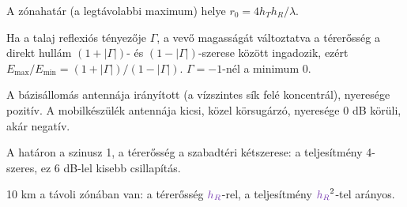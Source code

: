 A zónahatár (a legtávolabbi maximum) helye $r_0=4h_Th_R/\lambda$.

\begin{center}\end{center}

Ha a talaj reflexiós tényezője $\Gamma$, a vevő magasságát változtatva a térerősség a direkt hullám $(1+|\Gamma|)$- és $(1-|\Gamma|)$-szerese között ingadozik, ezért $E_{\max}/E_{\min}=(1+|\Gamma|)/(1-|\Gamma|)$. $\Gamma=-1$-nél a minimum 0.

\begin{center}\end{center}

A bázisállomás antennája irányított (a vízszintes sík felé koncentrál), nyeresége pozitív. A mobilkészülék antennája kicsi, közel körsugárzó, nyeresége 0 dB körüli, akár negatív.

A határon a szinusz 1, a térerősség a szabadtéri kétszerese: a teljesítmény 4-szeres, ez 6 dB-lel kisebb csillapítás.

\begin{center}\end{center}

\begin{center}\end{center}

10 km a távoli zónában van: a térerősség ${\cc{h_R}}$-rel, a teljesítmény ${\cc{h_R}}^2$-tel arányos.

\begin{center}\end{center}
\begin{eredmeny}

\begin{center}\end{center}
\end{eredmeny}



